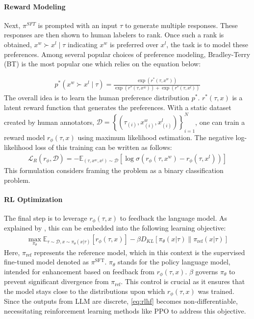 \paragraph{\bf Reward Modeling} Next, $\pi^{SFT}$ is prompted with an input $\tau$ to generate multiple responses. These responses are then shown to human labelers to rank. Once such a rank is obtained, $x^w \succ x^l \mid \tau $ indicating $x^w$ is preferred over $x^l$, the task is to model these preferences. Among several popular choices of preference modeling, Bradley-Terry (BT) is the most popular one which relies on the equation below:

\begin{align}
    p^*(x^w \succ x^l \mid \tau) = \frac{\exp(r^*(\tau, x^w))}{\exp(r^*(\tau, x^w)) + \exp(r^*(\tau, x^l))} \label{eqn:BT}
\end{align}
The overall idea is to learn the human preference distribution $p^*$. $r^*(\tau, x)$ is a latent reward function that generates the preferences. With a static dataset created by human annotators, $\mathcal{D} = \left\{ \left(\tau_{(i)}, x^{w}_{(i)}, x^{l}_{(i)}\right) \right\}_{i=1}^{N}$, one can train a reward model  $r_\phi(\tau, x)$ using maximum likelihood estimation. The negative log-likelihood loss of this training can be written as follows:
\begin{align}
    \mathcal{L}_R(r_{\phi}, \mathcal{D}) = -\mathbb{E}_{(\tau, x^w, x^l) \sim \mathcal{D}} \left[ \log \sigma (r_{\phi}(\tau, x^w) - r_{\phi}(\tau, x^l)) \right]  \label{eq:NLL}
\end{align}
This formulation considers framing the problem as a binary classification problem. 

\paragraph{\bf RL Optimization}
The final step is to leverage $r_\phi(\tau, x)$ to feedback the language model. As explained by \citet{rafailov2023direct}, this can be embedded into the following learning objective:
\begin{align}
\label{eq:rlhf}
    \max_{\pi_{\theta}} \mathbb{E}_{\tau \sim \mathcal{D}, x \sim \pi_{\theta}(x|\tau)} \left[ r_{\phi}(\tau, x) \right] - \beta D_{KL} \left[ \pi_{\theta}(x|\tau) \parallel \pi_{\text{ref}}(x|\tau) \right]  
\end{align}
Here, $\pi_{\text{ref}}$ represents the reference model, which in this context is the supervised fine-tuned model denoted as $\pi^{\text{SFT}}$. $\pi_{\theta}$ stands for the policy language model, intended for enhancement based on feedback from $r_\phi(\tau, x)$. $\beta$ governs $\pi_{\theta}$ to prevent significant divergence from $\pi_{\text{ref}}$. This control is crucial as it ensures that the model stays close to the distributions upon which $r_\phi(\tau, x)$ was trained. Since the outputs from LLM are discrete, \cref{eq:rlhf} becomes non-differentiable, necessitating reinforcement learning methods like PPO to address this objective.

